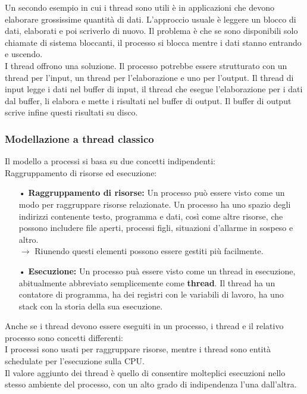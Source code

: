 \documentclass{article}
\begin{document}
Un secondo esempio in cui i thread sono utili è in applicazioni che devono elaborare grossissime quantità di dati. L'approccio usuale è leggere un blocco di dati, elaborati e poi scriverlo di nuovo. Il problema è che se sono disponibili solo chiamate di sistema bloccanti, il processo si blocca mentre i dati stanno entrando e uscendo.
\\I thread offrono una soluzione. Il processo potrebbe essere strutturato con un thread per l’input, un thread per l’elaborazione e uno per l’output. Il thread di input legge i dati nel buffer di input, il thread che esegue l’elaborazione per i dati dal buffer, li elabora e mette i risultati nel buffer di output. Il buffer di output scrive infine questi risultati su disco.

\subsubsection{Modellazione a thread classico}
Il modello a processi si basa su due concetti indipendenti:
\\Raggruppamento di risorse ed esecuzione:
\begin{enumerate}
   \item[•] \textbf{Raggruppamento di risorse:} Un processo può essere visto come un modo per raggruppare risorse relazionate. Un processo ha uno spazio degli indirizzi contenente testo, programma e dati, così come altre risorse, che possono includere file aperti, processi figli, situazioni d'allarme in sospeso e altro.\\
      $\rightarrow$ Riunendo questi elementi possono essere gestiti più facilmente.
   \item[•] \textbf{Esecuzione:} Un processo puà essere visto come un thread in esecuzione, abitualmente abbreviato semplicemente come \textbf{thread}. Il thread ha un contatore di programma, ha dei registri con le variabili di lavoro, ha uno stack con la storia della sua esecuzione.
\end{enumerate}
Anche se i thread devono essere eseguiti in un processo, i thread e il relativo processo sono concetti differenti:
\\I processi sono usati per raggruppare risorse, mentre i thread sono entità schedulate per l'esecuzione sulla CPU.
\\
Il valore aggiunto dei thread è quello di consentire molteplici esecuzioni nello stesso ambiente del processo, con un alto grado di indipendenza l'una dall'altra.
\\
\\
\end{document}
